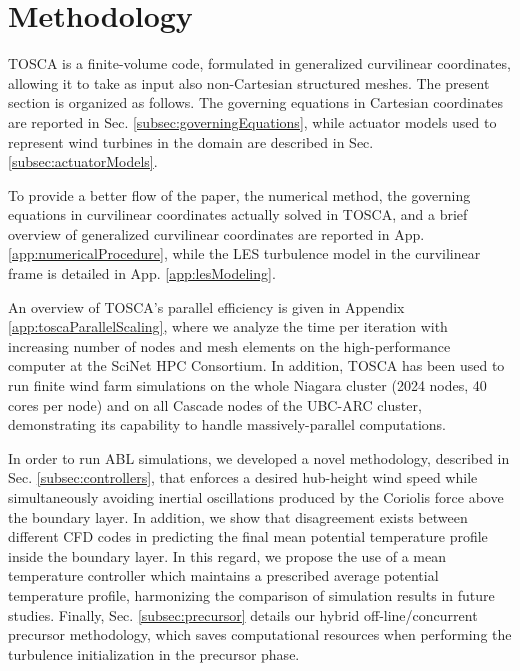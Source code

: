 \documentclass[journal abbreviation, manuscript]{copernicus}
\begin{document}
\section{Methodology}
\label{sec:methodology}
TOSCA is a finite-volume code, formulated in generalized curvilinear coordinates, allowing it to take as input also non-Cartesian structured meshes. The present section is organized as follows. The governing equations in Cartesian coordinates are reported in Sec. \ref{subsec:governingEquations}, while actuator models used to represent wind turbines in the domain are described in Sec. \ref{subsec:actuatorModels}.

To provide a better flow of the paper, the numerical method, the governing equations in curvilinear coordinates actually solved in TOSCA, and a brief overview of generalized curvilinear coordinates are reported in App. \ref{app:numericalProcedure}, while the LES turbulence model in the curvilinear frame is detailed in App. \ref{app:lesModeling}.

An overview of TOSCA's parallel efficiency is given in Appendix \ref{app:toscaParallelScaling}, where we analyze the time per iteration with increasing number of nodes and mesh elements on the \cite{niagaraWebPage} \citep{niagaraDatacenter, niagaraDeployment} high-performance computer at the SciNet HPC Consortium. In addition, TOSCA has been used to run finite wind farm simulations on the whole Niagara cluster (2024 nodes, 40 cores per node) and on all Cascade nodes of the UBC-ARC \cite{sockeyeWebPage} cluster, demonstrating its capability to handle massively-parallel computations.

In order to run ABL simulations, we developed a novel methodology, described in Sec. \ref{subsec:controllers}, that enforces a desired hub-height wind speed while simultaneously avoiding inertial oscillations produced by the Coriolis force above the boundary layer. In addition, we show that disagreement exists between different CFD codes in predicting the final mean potential temperature profile inside the boundary layer. In this regard, we propose the use of a mean temperature controller which maintains a prescribed average potential temperature profile, harmonizing the comparison of simulation results in future studies. Finally, Sec. \ref{subsec:precursor} details our hybrid off-line/concurrent precursor methodology, which saves computational resources when performing the turbulence initialization in the precursor phase. 
\end{document}
